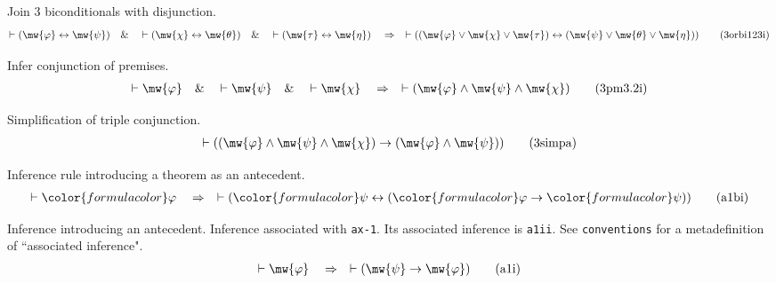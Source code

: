 \begin{lemma} Join 3 biconditionals with disjunction. 
\begin{align}
\vdash ( \mw{\varphi} \leftrightarrow \mw{\psi} )\quad\&\quad \vdash (
    \mw{\chi} \leftrightarrow \mw{\theta} )\quad\&\quad \vdash ( \mw{\tau}
    \leftrightarrow \mw{\eta} )\quad\Rightarrow\quad \vdash ( ( \mw{\varphi}
    \vee \mw{\chi} \vee \mw{\tau} ) \leftrightarrow ( \mw{\psi} \vee
    \mw{\theta} \vee \mw{\eta} ) )\label{eq:3orbi123i}\tag{3orbi123i}
\end{align}
\end{lemma}


\begin{lemma} {Infer conjunction of premises.} 
\begin{align}
\vdash \mw{\varphi}\quad\&\quad \vdash \mw{\psi}\quad\&\quad \vdash
    \mw{\chi}\quad\Rightarrow\quad \vdash ( \mw{\varphi} \wedge \mw{\psi}
    \wedge \mw{\chi} )\label{eq:3pm3.2i}\tag{3pm3.2i}
\end{align}
\end{lemma}


\begin{lemma} {Simplification of triple conjunction.} 
\begin{align}
\vdash ( ( \mw{\varphi} \wedge \mw{\psi} \wedge \mw{\chi} ) \rightarrow ( \mw{\varphi} \wedge \mw{\psi}
    ) )\label{eq:3simpa}\tag{3simpa}
\end{align}
\end{lemma}


\begin{lemma} {Inference rule introducing a theorem as an
antecedent.}  %
\begin{align}
\vdash {\color{formulacolor}\varphi}\quad\Rightarrow\quad \vdash (
    {\color{formulacolor}\psi} \leftrightarrow ( {\color{formulacolor}\varphi}
    \rightarrow {\color{formulacolor}\psi} ) )\label{eq:a1bi}\tag{a1bi}
\end{align}
\end{lemma}


\begin{lemma} {Inference introducing an antecedent.}  Inference
associated with {\tt ax-1}.
       Its associated inference is {\tt a1ii}.  See {\tt conventions} for a
metadefinition
       of ``associated inference".  %
\begin{align}
\vdash \mw{\varphi}\quad\Rightarrow\quad \vdash ( \mw{\psi} \rightarrow
    \mw{\varphi} )\label{eq:a1i}\tag{a1i}
\end{align}
\end{lemma}


